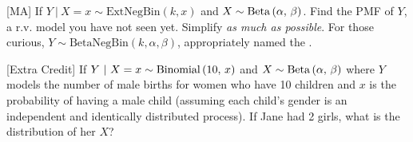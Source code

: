 \documentclass[12pt]{article}
\begin{document}
 [MA] If $Y~|~X = x \sim \text{ExtNegBin}(k, x)$ and $X \sim \mathrm{Beta}\left(\alpha,\,\beta\right)$. Find the PMF of $Y$, a r.v. model you have not seen yet. Simplify \textit{as much as possible}. For those curious, $Y \sim \text{BetaNegBin}(k, \alpha, \beta)$, appropriately named the . 

 [Extra Credit] If $Y~|~X = x \sim \mathrm{Binomial}\left(10,\,x\right)$ and $X \sim \mathrm{Beta}\left(\alpha,\,\beta\right)$ where $Y$ models the number of male births for women who have 10 children and $x$ is the probability of having a male child (assuming each child's gender is an independent and identically distributed process). If Jane had 2 girls, what is the distribution of her $X$? 




\eenum
\end{document}
